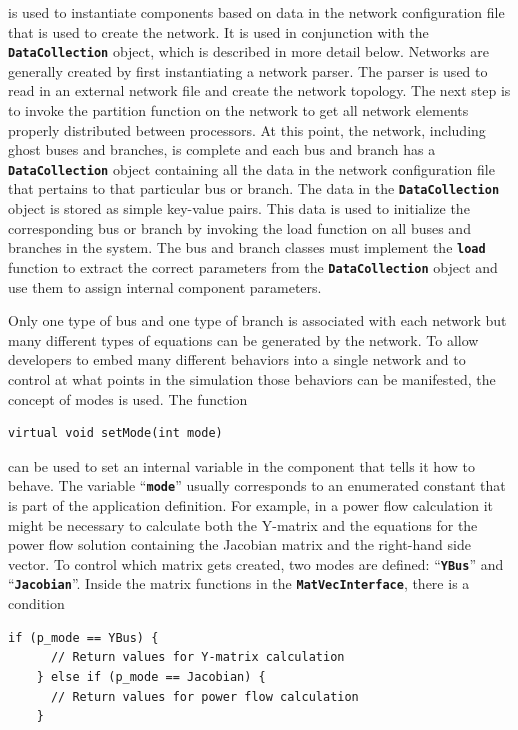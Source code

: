 is used to instantiate components based on data in the network configuration file that is used to create the network. It is used in conjunction with the \texttt{\textbf{DataCollection}} object, which is described in more detail below. Networks are generally created by first instantiating a network parser. The parser is used to read in an external network file and create the network topology. The next step is to invoke the partition function on the network to get all network elements properly distributed between processors. At this point, the network, including ghost buses and branches, is complete and each bus and branch has a \texttt{\textbf{DataCollection}} object containing all the data in the network configuration file that pertains to that particular bus or branch. The data in the \texttt{\textbf{DataCollection}} object is stored as simple key-value pairs. This data is used to initialize the corresponding bus or branch by invoking the load function on all buses and branches in the system. The bus and branch classes must implement the \texttt{\textbf{load}} function to extract the correct parameters from the \texttt{\textbf{DataCollection}} object and use them to assign internal component parameters.

Only one type of bus and one type of branch is associated with each network but many different types of equations can be generated by the network. To allow developers to embed many different behaviors into a single network and to control at what points in the simulation those behaviors can be manifested, the concept of modes is used. The function

{
\color{red}
\begin{Verbatim}[fontseries=b]
virtual void setMode(int mode)
\end{Verbatim}
}

can be used to set an internal variable in the component that tells it how to behave. The variable ``\texttt{\textbf{mode}}'' usually corresponds to an enumerated constant that is part of the application definition. For example, in a power flow calculation it might be necessary to calculate both the Y-matrix and the equations for the power flow solution containing the Jacobian matrix and the right-hand side vector. To control which matrix gets created, two modes are defined: ``\texttt{\textbf{YBus}}'' and ``\texttt{\textbf{Jacobian}}''. Inside the matrix functions in the \texttt{\textbf{MatVecInterface}}, there is a condition

{
\color{red}
\begin{Verbatim}[fontseries=b]
    if (p_mode == YBus) {
      // Return values for Y-matrix calculation
    } else if (p_mode == Jacobian) {
      // Return values for power flow calculation
    }
\end{Verbatim}
}

